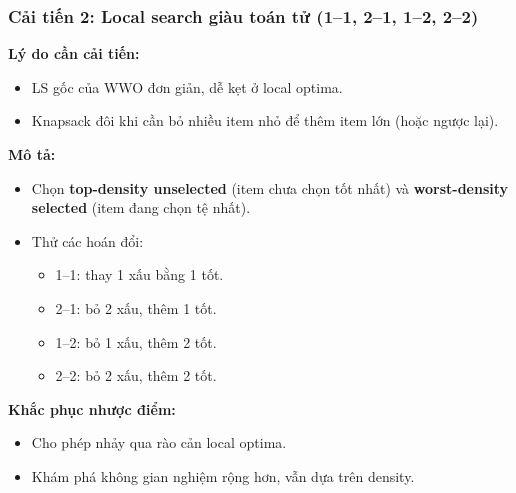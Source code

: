 \begin{frame}
    \frametitle{Cải tiến 2: Local search giàu toán tử (1–1, 2–1, 1–2, 2–2)}
    \textbf{Lý do cần cải tiến:}
    \begin{itemize}
        \item LS gốc của WWO đơn giản, dễ kẹt ở local optima.
        \item Knapsack đôi khi cần bỏ nhiều item nhỏ để thêm item lớn (hoặc ngược lại).
    \end{itemize}
    \textbf{Mô tả:}
    \begin{itemize}
        \item Chọn \textbf{top-density unselected} (item chưa chọn tốt nhất) và \textbf{worst-density selected} (item đang chọn tệ nhất).
        \item Thử các hoán đổi:
        \begin{itemize}
            \item 1–1: thay 1 xấu bằng 1 tốt.
            \item 2–1: bỏ 2 xấu, thêm 1 tốt.
            \item 1–2: bỏ 1 xấu, thêm 2 tốt.
            \item 2–2: bỏ 2 xấu, thêm 2 tốt.
        \end{itemize}
    \end{itemize}

    \textbf{Khắc phục nhược điểm:}
    \begin{itemize}
        \item Cho phép nhảy qua rào cản local optima.
        \item Khám phá không gian nghiệm rộng hơn, vẫn dựa trên density.
    \end{itemize}
\end{frame}


